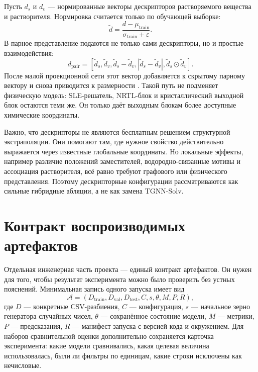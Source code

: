 \documentclass[11pt]{article}
\DeclareRobustCommand{\code}[1]{\texttt{\detokenize{#1}}}
\theoremstyle{definition}
\begin{document}
Пусть $d_s$ и $d_v$ --- нормированные векторы дескрипторов растворяемого вещества и растворителя. Нормировка считается только по обучающей выборке:
\begin{equation*}
    \tilde d=\frac{d-\mu_{\mathrm{train}}}{\sigma_{\mathrm{train}}+\varepsilon}.
\end{equation*}
В парное представление подаются не только сами дескрипторы, но и простые взаимодействия:
\begin{equation*}
    d_{\mathrm{pair}}
    =
    [\tilde d_s,\tilde d_v,\tilde d_s-\tilde d_v,
      |\tilde d_s-\tilde d_v|,\tilde d_s\odot \tilde d_v].
\end{equation*}
После малой проекционной сети этот вектор добавляется к скрытому парному вектору и снова приводится к размерности \code{pair\_dim}. Такой путь не подменяет физическую модель: SLE-решатель, NRTL-блок и кристаллический выходной блок остаются теми же. Он только даёт выходным блокам более доступные химические координаты.

Важно, что дескрипторы не являются бесплатным решением структурной экстраполяции. Они помогают там, где нужное свойство действительно выражается через известные глобальные координаты. Но локальные эффекты, например различие положений заместителей, водородно-связанные мотивы и ассоциация растворителя, всё равно требуют графового или физического представления. Поэтому дескрипторные конфигурации рассматриваются как сильные гибридные абляции, а не как замена TGNN-Solv.

\section{Контракт воспроизводимых артефактов}
\label{app:artifact-contract}

Отдельная инженерная часть проекта --- единый контракт артефактов. Он нужен для того, чтобы результат эксперимента можно было проверить без устных пояснений. Минимальная запись одного запуска имеет вид
\begin{equation*}
    \mathcal A
    =
    (D_{\mathrm{train}},D_{\mathrm{val}},D_{\mathrm{test}},
     C,s,\theta,M,P,R),
\end{equation*}
где $D$ --- конкретные CSV-разбиения, $C$ --- конфигурация, $s$ --- начальное зерно генератора случайных чисел, $\theta$ --- сохранённое состояние модели, $M$ --- метрики, $P$ --- предсказания, $R$ --- манифест запуска с версией кода и окружением. Для наборов сравнительной оценки дополнительно сохраняется карточка эксперимента: какие модели сравнивались, какая целевая величина использовалась, были ли фильтры по единицам, какие строки исключены как нечисловые.
\end{document}
